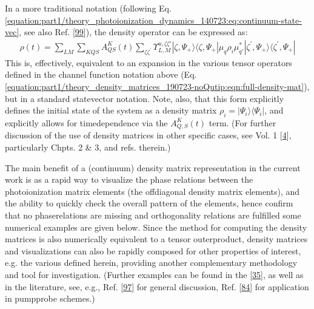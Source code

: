 \documentclass[letterpaper,table,10pt,english]{jupyterBook}
\begin{document}
\sphinxAtStartPar
In a more traditional notation (following Eq. \eqref{equation:part1/theory_photoionization_dynamics_140723:eq:continuum-state-vec}, see also Ref. {[}\hyperlink{cite.backmatter/bibliography:id635}{99}{]}), the density operator can be expressed as:
\begin{equation}\label{equation:part1/theory_density_matrices_190723-noQutip:eqn:full-density-mat-traditional}
\begin{split}
\rho(t) =\sum_{LM}\sum_{KQS}A^{K}_{QS}(t)\sum_{\zeta\zeta^{\prime}}\varUpsilon_{L,M}^{u,\zeta\zeta'}|\zeta,\Psi_+\rangle\langle\zeta,\Psi_+|\mu_q\rho_i\mu_{q\prime}^{*}|\zeta^{\prime},\Psi_+\rangle\langle\zeta^{\prime},\Psi_+|
\end{split}
\end{equation}
\sphinxAtStartPar
This is, effectively, equivalent to an expansion in the various tensor operators defined in the channel function notation above (Eq. \eqref{equation:part1/theory_density_matrices_190723-noQutip:eqn:full-density-mat}), but in a standard state\sphinxhyphen{}vector notation. Note, also, that this form explicitly defines the initial state of the system as a density matrix \(\rho_i = |\Psi_i\rangle\langle\Psi_i|\), and explicitly allows for time\sphinxhyphen{}dependence via the \(A_{Q,S}^{K}(t)\) term. (For further discussion of the use of density matrices in other specific cases, see  Vol. 1 {[}\hyperlink{cite.backmatter/bibliography:id675}{4}{]}, particularly Chpts. 2 \& 3, and refs. therein.)

\sphinxAtStartPar
The main benefit of a (continuum) density matrix representation in the current work is as a rapid way to visualize the phase relations between the photoionization matrix elements (the off\sphinxhyphen{}diagonal density matrix elements), and the ability to quickly check the overall pattern of the elements, hence confirm that no phase\sphinxhyphen{}relations are missing and orthogonality relations are fulfilled \sphinxhyphen{} some numerical examples are given below. Since the method for computing the density matrices is also numerically equivalent to a tensor outer\sphinxhyphen{}product, density matrices and visualizations can also be rapidly composed for other properties of interest, e.g. the various {\hyperref[\detokenize{backmatter/glossary:term-channel-functions}]{}} defined herein, providing another complementary methodology and tool for investigation. (Further examples can be found in the  {[}\hyperlink{cite.backmatter/bibliography:id604}{35}{]}, as well as in the literature, see, e.g., Ref. {[}\hyperlink{cite.backmatter/bibliography:id533}{97}{]} for general discussion, Ref. {[}\hyperlink{cite.backmatter/bibliography:id834}{84}{]} for application in pump\sphinxhyphen{}probe schemes.)
\end{document}
